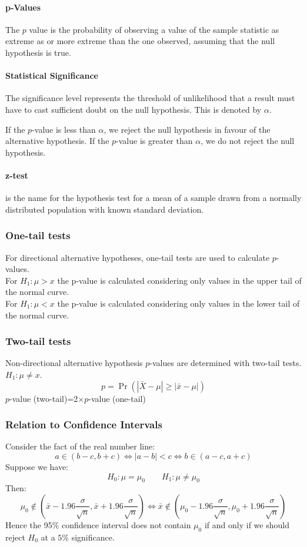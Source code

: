 \documentclass[a4paper,twoside,10pt]{article}
\begin{document}
			\paragraph{p-Values} The $p$ value is the probability of observing a value of the sample statistic as extreme as or more extreme than the one observed, assuming that the null hypothesis is true.
			
			\paragraph{Statistical Significance} The significance level represents the threshold of unlikelihood that a result must have to cast sufficient doubt on the null hypothesis. This is denoted by $\alpha$.
			
			If the $p$-value is less than $\alpha$, we reject the null hypothesis in favour of the alternative hypothesis. If the $p$-value is greater than $\alpha$, we do not reject the null hypothesis.
			
			\paragraph{z-test} is the name for the hypothesis test for a mean of a sample drawn from a normally distributed population with known standard deviation.
			
			\subsubsection{One-tail tests}
				For directional alternative hypotheses, one-tail tests are used to calculate $p$-values.\\
				For $H_1:\mu>x$ the p-value is calculated considering only values in the upper tail of the normal curve.\\
				For $H_1:\mu<x$ the p-value is calculated considering only values in the lower tail of the normal curve.\\
			\subsubsection{Two-tail tests}
				Non-directional alternative hypothesis $p$-values are determined with two-tail tests. $H_1:\mu\neq x$.\\
				\[
					p=\Pr\left(\left|\bar{X}-\mu\right|\geq\left|\bar{x}-\mu\right|\right)
				\]
				$p$-value (two-tail)=2$\times p$-value (one-tail)
			\subsubsection{Relation to Confidence Intervals}
				Consider the fact of the real number line:
				\[
					a\in\left(b-c,b+c\right)\iff|a-b|<c\iff b\in(a-c,a+c)
				\]
				Suppose we have:
				\[
					H_0:\mu=\mu_0 \qquad H_1:\mu\neq\mu_0
				\]
				Then:
				\[
					\mu_0\notin\left(\bar{x}-1.96\frac{\sigma}{\sqrt{n}},\bar{x}+1.96\frac{\sigma}{\sqrt{n}}\right)\iff\bar{x}\notin\left(\mu_0-1.96\frac{\sigma}{\sqrt{n}},\mu_0+1.96\frac{\sigma}{\sqrt{n}}\right)
				\]
				Hence the 95\% confidence interval does not contain $\mu_0$ if and only if we should reject $H_0$ at a $5\%$ significance.
\end{document}
